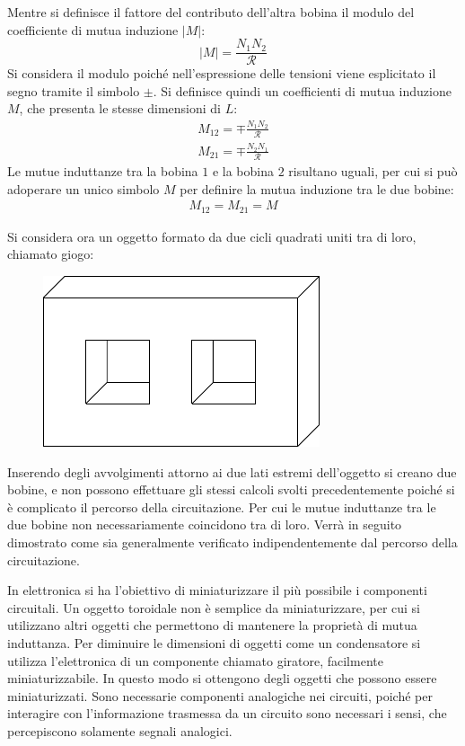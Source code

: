 \documentclass{article}
\numberwithin{equation}{subsection}
\begin{document}
Mentre si definisce il fattore del contributo dell'altra bobina il modulo del coefficiente di mutua induzione $|M|$:
\begin{equation}
    |M|=\displaystyle\frac{N_1 N_2}{\mathscr{R}}
\end{equation}
Si considera il modulo poiché nell'espressione delle tensioni viene esplicitato il segno tramite il simbolo $\pm$. Si definisce quindi un coefficienti di mutua induzione $M$, 
che presenta le stesse dimensioni di $L$:
\begin{gather*}
    M_{12}=\mp\displaystyle\frac{N_1 N_2}{\mathscr{R}}\\
    M_{21}=\mp\displaystyle\frac{N_2 N_1}{\mathscr{R}}
\end{gather*}
Le mutue induttanze tra la bobina $1$ e la bobina $2$ risultano uguali, per cui si può adoperare un unico simbolo $M$ per definire la mutua induzione tra le due bobine:
\begin{gather*}
    M_{12}=M_{21}=M
\end{gather*}

Si considera ora un oggetto formato da due cicli quadrati uniti tra di loro, chiamato giogo:
\begin{figure}[ht]%
    \centering
    \includegraphics{giogo.pdf}
    \label{fig:giogo}
\end{figure}

Inserendo degli avvolgimenti attorno ai due lati estremi dell'oggetto si creano due bobine, e non possono effettuare gli stessi calcoli svolti precedentemente poiché si è 
complicato il percorso della circuitazione. Per cui le mutue induttanze tra le due bobine non necessariamente coincidono tra di loro. Verrà in seguito dimostrato come sia 
generalmente verificato indipendentemente dal percorso della circuitazione. 


In elettronica si ha l'obiettivo di miniaturizzare il più possibile i componenti circuitali. Un oggetto toroidale non è semplice da miniaturizzare, per cui si utilizzano 
altri oggetti che permettono di mantenere la proprietà di mutua induttanza. 
Per diminuire le dimensioni di oggetti come un condensatore si utilizza l'elettronica di un componente chiamato giratore, facilmente miniaturizzabile. In questo modo si 
ottengono degli oggetti che possono essere miniaturizzati. 
Sono necessarie componenti analogiche nei circuiti, poiché per interagire con l'informazione trasmessa da un circuito sono necessari i sensi, che percepiscono solamente 
segnali analogici. 
\end{document}
